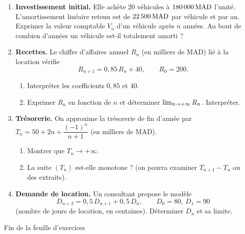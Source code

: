 \documentclass[11pt,a4paper]{article}
\begin{document}
\begin{enumerate}
  \item \textbf{Investissement initial.} Elle achète $20$ véhicules à $180\,000\,\mathrm{MAD}$ l'unité. L'amortissement linéaire retenu est de $22\,500\,\mathrm{MAD}$ par véhicule et par an. Exprimer la valeur comptable $V_n$ d'un véhicule après $n$ années. Au bout de combien d'années un véhicule est-il totalement amorti ?
  \item \textbf{Recettes.} Le chiffre d'affaires annuel $R_n$ (en milliers de MAD) lié à la location vérifie
  \[
  R_{n+1} = 0{,}85\, R_n + 40, \qquad R_0 = 200.
  \]
  \begin{enumerate}
    \item Interpréter les coefficients $0{,}85$ et $40$.
    \item Exprimer $R_n$ en fonction de $n$ et déterminer $\lim_{n\to +\infty} R_n$. Interpréter.
  \end{enumerate}
  \item \textbf{Trésorerie.} On approxime la trésorerie de fin d'année par $T_n = 50 + 2n + \dfrac{(-1)^n}{n+1}$ (en milliers de MAD).
  \begin{enumerate}
    \item Montrer que $T_n \to +\infty$.
    \item La suite $(T_n)$ est-elle monotone ? (on pourra examiner $T_{n+1}-T_n$ ou des extraits).
  \end{enumerate}
  \item \textbf{Demande de location.} Un consultant propose le modèle
  \[
  D_{n+2} = 0{,}5\, D_{n+1} + 0{,}5\, D_n, \qquad D_0 = 80,\ D_1 = 90
  \]
  (nombre de jours de location, en centaines). Déterminer $D_n$ et sa limite.
\end{enumerate}

\vspace{0.6cm}
\begin{center}
{\small\color{mundigray} Fin de la feuille d'exercices}
\end{center}
\end{document}
